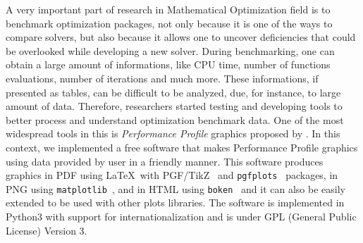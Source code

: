 A very important part of research in Mathematical Optimization field is to benchmark
optimization packages, not only because it is one of the ways to compare
solvers, but also because it allows one to uncover deficiencies that could
be overlooked while developing a new solver. During benchmarking, one can
obtain a large amount of  informations, like CPU time, number of functions
evaluations, number of iterations and much more. These informations, if
presented as tables, can be difficult to be analyzed, due, for instance, to
large amount of data.  Therefore, researchers started testing and developing
tools to better process and understand optimization benchmark data. One of
the most widespread tools in this is \emph{Performance Profile} graphics proposed by
\textcite{Dolan:2002du}. In this context, we implemented a free software
that makes Performance Profile graphics using data provided by user in a
friendly manner. This software produces graphics in PDF using \LaTeX\ with
PGF/TikZ~\cite{TikZ} and \texttt{pgfplots}~\cite{pgfplots} packages, in
PNG using \texttt{matplotlib}~\cite{Hunter:2007}, and in HTML using
\texttt{boken}~\cite{url:bokeh} and it can also be easily
extended to be used with other plots libraries. The software is implemented
in Python3 with support for internationalization and is under GPL (General
Public License) Version 3.
